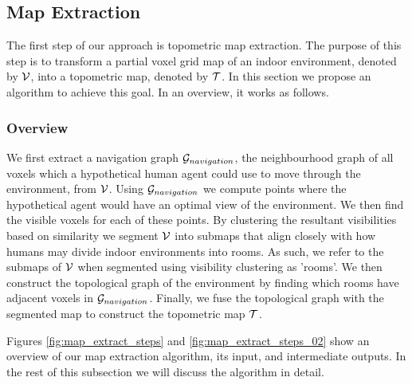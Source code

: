 \subsection{Map Extraction}
The first step of our approach is topometric map extraction.
The purpose of this step is to transform a partial voxel grid map of an indoor environment, denoted by \(\mathcal{V}\), into a topometric map, denoted by \(\mathcal{T}\). In this section we propose an algorithm to achieve this goal. In an overview, it works as follows.

\subsubsection{Overview}
We first extract a navigation graph \(\mathcal{G}_{navigation}\), the neighbourhood graph of all voxels which a hypothetical human agent could use to move through the environment, from \(\mathcal{V}\). Using \(\mathcal{G}_{navigation}\) we compute points where the hypothetical agent would have an optimal view of the environment. We then find the visible voxels for each of these points. By clustering the resultant visibilities based on similarity we segment \(\mathcal{V}\) into submaps that align closely with how humans may divide indoor environments into rooms. As such, we refer to the submaps of \(\mathcal{V}\) when segmented using visibility clustering as 'rooms'. We then construct the topological graph of the environment by finding which rooms have adjacent voxels in \(\mathcal{G}_{navigation}\). Finally, we fuse the topological graph with the segmented map to construct the topometric map \(\mathcal{T}\). 

Figures \ref{fig:map_extract_steps} and \ref{fig:map_extract_steps_02} show an overview of our map extraction algorithm, its input, and intermediate outputs. In the rest of this subsection we will discuss the algorithm in detail.

